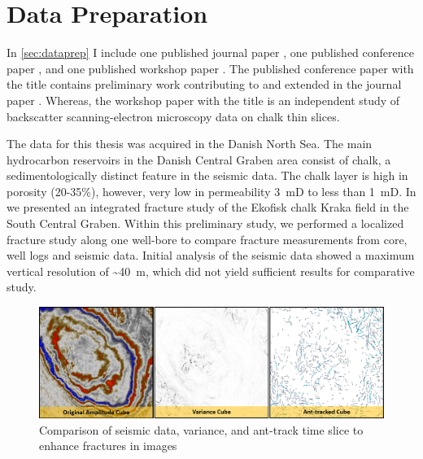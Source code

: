 \section{Data Preparation}

In \cref{sec:dataprep} I include one published journal paper \citep{aabo2018integrated}, one published conference paper \citep{aabo2017correlation}, and one published workshop paper \citep{dramsch2018gaussian}. The published conference paper with the title  \citep{aabo2017correlation} contains preliminary work contributing to and extended in the journal paper  \citep{aabo2018integrated}. Whereas, the workshop paper with the title  \citep{dramsch2018gaussian} is an independent study of backscatter scanning-electron microscopy data on chalk thin slices.

The data for this thesis was acquired in the Danish North Sea. The main hydrocarbon reservoirs in the Danish Central Graben area consist of chalk, a sedimentologically distinct feature in the seismic data. The chalk layer is high in porosity (20-35\%), however, very low in permeability 3~mD to less than 1~mD. In \citet{aabo2017correlation} we presented an integrated fracture study of the Ekofisk chalk Kraka field in the South Central Graben. Within this preliminary study, we performed a localized fracture study along one well-bore to compare fracture measurements from core, well logs and seismic data. Initial analysis of the seismic data showed a maximum vertical resolution of \textasciitilde40~m, which did not yield sufficient results for comparative study. 

\begin{figure}[!ht]
    \centering
    \includegraphics[width=\textwidth]{figures/seismic-comparisons.png}
    \caption{Comparison of seismic data, variance, and ant-track time slice to enhance fractures in images \citep[modified from][]{aabo2018integrated}}
    \label{fig:seismic-comparison}
\end{figure}


